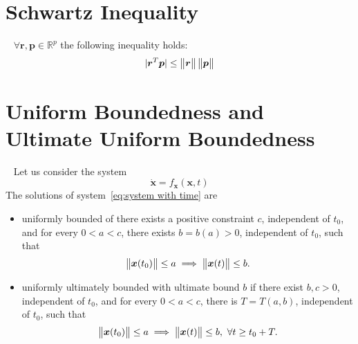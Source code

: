 \section{Schwartz Inequality}\label{app:schwartz}
\begin{definition}
	~\cite{strang1988bookLinearAlgebra}
	$\forall \bm{r},\bm{p} \in\mathbb{R}^p$ the following inequality holds:
	\begin{equation}\label{eq:schwartz inequality}
		|\bm{r}^T\bm{p}|\leq\begin{Vmatrix} \bm{r} \end{Vmatrix}\begin{Vmatrix} \bm{p} \end{Vmatrix}
	\end{equation}
\end{definition}

\section{Uniform Boundedness and Ultimate Uniform Boundedness}\label{app:boundedness}
\begin{definition}\label{def-app:boundedness}~\cite{khalil2002NonLinearSystems}
	Let us consider the system 
	\begin{equation}\label{eq:system with time}
		\bm{\dot{x}} = f_{\bm{x}} (\bm{x},t)
	\end{equation}
The solutions of system~\cref{eq:system with time} are 
\begin{itemize}
	\item uniformly bounded of there exists a positive constraint $c$, independent of $t_0$, and for every $0<a<c$, there exists $b=b(a)>0$, independent of $t_0$, such that
	\begin{equation}
		\begin{Vmatrix} \bm{x}(t_0) \end{Vmatrix}\leq a \implies \begin{Vmatrix} \bm{x}(t) \end{Vmatrix}\leq b.
	\end{equation}
	\item uniformly ultimately bounded with ultimate bound $b$ if there exist $b,c>0$, independent of $t_0$, and for every $0<a<c$, there is $T=T(a,b)$, independent of $t_0$, such that
		\begin{equation}
		\begin{Vmatrix} \bm{x}(t_0) \end{Vmatrix}\leq a \implies \begin{Vmatrix} \bm{x}(t) \end{Vmatrix}\leq b, \ \forall t\geq t_0 +T.
	\end{equation}
\end{itemize}
\end{definition}
